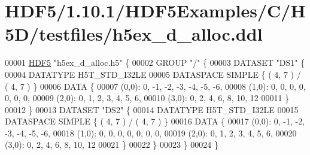 \hypertarget{_h_d_f5_21_810_81_2_h_d_f5_examples_2_c_2_h5_d_2testfiles_2h5ex__d__alloc_8ddl_source}{}\section{H\+D\+F5/1.10.1/\+H\+D\+F5\+Examples/\+C/\+H5\+D/testfiles/h5ex\+\_\+d\+\_\+alloc.ddl}
\label{_h_d_f5_21_810_81_2_h_d_f5_examples_2_c_2_h5_d_2testfiles_2h5ex__d__alloc_8ddl_source}

\begin{DoxyCode}
00001 \hyperlink{namespace_h_d_f5}{HDF5} \textcolor{stringliteral}{"h5ex\_d\_alloc.h5"} \{
00002 GROUP \textcolor{stringliteral}{"/"} \{
00003    DATASET \textcolor{stringliteral}{"DS1"} \{
00004       DATATYPE  H5T\_STD\_I32LE
00005       DATASPACE  SIMPLE \{ ( 4, 7 ) / ( 4, 7 ) \}
00006       DATA \{
00007       (0,0): 0, -1, -2, -3, -4, -5, -6,
00008       (1,0): 0, 0, 0, 0, 0, 0, 0,
00009       (2,0): 0, 1, 2, 3, 4, 5, 6,
00010       (3,0): 0, 2, 4, 6, 8, 10, 12
00011       \}
00012    \}
00013    DATASET \textcolor{stringliteral}{"DS2"} \{
00014       DATATYPE  H5T\_STD\_I32LE
00015       DATASPACE  SIMPLE \{ ( 4, 7 ) / ( 4, 7 ) \}
00016       DATA \{
00017       (0,0): 0, -1, -2, -3, -4, -5, -6,
00018       (1,0): 0, 0, 0, 0, 0, 0, 0,
00019       (2,0): 0, 1, 2, 3, 4, 5, 6,
00020       (3,0): 0, 2, 4, 6, 8, 10, 12
00021       \}
00022    \}
00023 \}
00024 \}
\end{DoxyCode}
